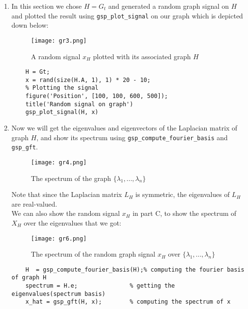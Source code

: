 \documentclass{article}
\begin{document}
\begin{enumerate}
    \item In this section we chose $H=G_t$ and generated a random graph signal on $H$ and plotted the result using \texttt{gsp\_plot\_signal} on our graph which is depicted down below:


    \begin{figure}[h!]
        \centering
        \texttt{[image: gr3.png]} %
        \caption{A random signal $x_H$ plotted with its associated graph $H$}
        \label{fig:gr3}
    \end{figure}

    \begin{lstlisting}
    H = Gt;
    x = rand(size(H.A, 1), 1) * 20 - 10;
    % Plotting the signal
    figure('Position', [100, 100, 600, 500]);
    title('Random signal on graph')
    gsp_plot_signal(H, x)
    \end{lstlisting}
    
    \item Now we will get the eigenvalues and eigenvectors of the Laplacian matrix of graph $H$, and show its spectrum using \texttt{gsp\_compute\_fourier\_basis} and \texttt{gsp\_gft}.

    \begin{figure}[h!]
        \centering
        \texttt{[image: gr4.png]} %
        \caption{The spectrum of the graph $\{\lambda_1, ...,\lambda_n\}$}
        \label{fig:gr4}
    \end{figure}        
    Note that since the Laplacian matrix $L_H$ is symmetric, the eigenvalues of $L_H$ are real-valued.
    \\
    We can also show the random signal $x_H$ in part C, to show the spectrum of $X_H$ over the eigenvalues that we got:

    \clearpage
    
    \begin{figure}[h!]
        \centering
        \texttt{[image: gr6.png]} %
        \caption{The spectrum of the random graph signal $x_H$ over $\{\lambda_1, ...,\lambda_n\}$}
        \label{fig:gr6}
    \end{figure} 

    \begin{lstlisting}
    H  = gsp_compute_fourier_basis(H);% computing the fourier basis of graph H
    spectrum = H.e;               % getting the eigenvalues(spectrum basis)
    x_hat = gsp_gft(H, x);        % computing the spectrum of x
    

\end{lstlisting}
\end{enumerate}
\end{document}

